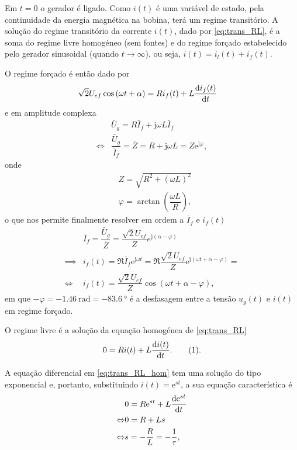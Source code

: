 \documentclass[a4paper, titlepage, portuguese]{article}
\newcommand{\eq}{\Leftrightarrow} %
\newcommand\numberthis{\addtocounter{equation}{1}\tag{\theequation}}
\newcommand\e{\mathrm{e} }
\newcommand\jj{\mathrm{j} }
\begin{document}
		\par
		Em $t = 0$ o gerador é ligado. Como $i(t)$ é uma variável de estado, pela continuidade da energia magnética na bobina, terá um regime transitório. A solução do regime transitório da corrente $i(t)$, dado por \eqref{eq:trans_RL}, é a soma do regime livre homogéneo (sem fontes) e do regime forçado estabelecido pelo gerador sinusoidal (quando $t \to \infty$), ou seja, $i(t) = i_l(t) + i_f(t)$.
		\par
		O regime forçado é então dado por
		\begin{align*}
			&\sqrt{2}U_{ef}\cos\left(\omega t + \alpha\right) = Ri_f(t) + L \dv{i_f(t)}{t}
		\end{align*}
		e em amplitude complexa
		\begin{align*}
			&\bar{U}_g = R\bar{I}_f + \jj \omega L\bar{I}_f \\ \eq
			&\dfrac{\bar{U}_g}{\bar{I}_f} = \bar{Z} = R + \jj \omega L = Z\e^{\jj\varphi},
		\end{align*}
		onde
		\begin{align*}
			&Z = \sqrt{R^2 + (\omega L)^2} \\
			&\varphi = \arctan\left(\dfrac{\omega L}{R}\right),
		\end{align*}
		o que nos permite finalmente resolver em ordem a $\bar{I}_f$ e $i_f(t)$
		\begin{align*}
			&\bar{I}_f = \dfrac{\bar{U}_g}{\bar{Z}} = \dfrac{\sqrt{2}U_{ef}}{Z} e^{\jj\left(\alpha - \varphi\right)} \\ \implies
			&i_f(t) = \Re{\bar{I}_f \e^{\jj \omega t}} = \Re{\dfrac{\sqrt{2}U_{ef}}{Z} \e^{\jj\left(\omega t + \alpha - \varphi\right)}} = \\ \eq
			&i_f(t) = \dfrac{\sqrt{2}U_{ef}}{Z} \cos\left(\omega t + \alpha - \varphi\right),
		\end{align*}
		em que $- \varphi = \SI{-1.46}{\radian} = \SI{-83.6}{\degree}$ é a desfasagem entre a tensão $u_g(t)$ e $i(t)$ em regime forçado.
		\par
		O regime livre é a solução da equação homogénea de \eqref{eq:trans_RL}
		\begin{align*}
			0 = R i(t) + L \dv{i(t)}{t}. \numberthis \label{eq:trans_RL_hom}.
		\end{align*}
		\par
		A equação diferencial em \eqref{eq:trans_RL_hom} tem uma solução do tipo exponencial e, portanto, substituindo $i(t) = \e^{st}$, a sua equação característica é
		\begin{align*}
			&0 = R\e^{st} + L\dv{\e^{st}}{t} \\ \eq
			&0 = R + Ls \\ \eq
			&s = - \dfrac{R}{L} = - \dfrac{1}{\tau},
		\end{align*}
\end{document}
